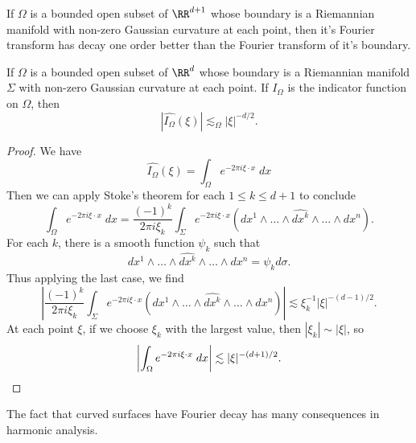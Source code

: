 If $\Omega$ is a bounded open subset of $\RR^{d+1}$ whose boundary is a Riemannian manifold with non-zero Gaussian curvature at each point, then it's Fourier transform has decay one order better than the Fourier transform of it's boundary.

\begin{corollary}
  If $\Omega$ is a bounded open subset of $\RR^d$ whose boundary is a Riemannian manifold $\Sigma$ with non-zero Gaussian curvature at each point. If $I_\Omega$ is the indicator function on $\Omega$, then
  \[ |\widehat{I_\Omega}(\xi)| \lesssim_\Omega |\xi|^{-d/2}. \]
\end{corollary}
\begin{proof}
  We have
  \[ \widehat{I_\Omega}(\xi) = \int_\Omega e^{-2 \pi i \xi \cdot x}\; dx \]
  Then we can apply Stoke's theorem for each $1 \leq k \leq d+1$ to conclude
  \[ \int_\Omega e^{-2 \pi i \xi \cdot x}\; dx = \frac{(-1)^k}{2 \pi i \xi_k} \int_\Sigma e^{-2 \pi i \xi \cdot x} (dx^1 \wedge \dots \wedge \widehat{dx^k} \wedge \dots \wedge dx^n). \]
  For each $k$, there is a smooth function $\psi_k$ such that
  \[ dx^1 \wedge \dots \wedge \widehat{dx^k} \wedge \dots \wedge dx^n = \psi_k d\sigma. \]
  Thus applying the last case, we find
  \[ \left| \frac{(-1)^k}{2 \pi i \xi_k} \int_\Sigma e^{-2 \pi i \xi \cdot x} (dx^1 \wedge \dots \wedge \widehat{dx^k} \wedge \dots \wedge dx^n) \right| \lesssim \xi_k^{-1} |\xi|^{-(d-1)/2}. \]
  At each point $\xi$, if we choose $\xi_k$ with the largest value, then $|\xi_k| \sim |\xi|$, so
  \[ \left| \int_\Omega e^{-2 \pi i \xi \cdot x}\; dx \right| \lesssim |\xi|^{-(d+1)/2}. \qedhere \]
\end{proof}

The fact that curved surfaces have Fourier decay has many consequences in harmonic analysis.

